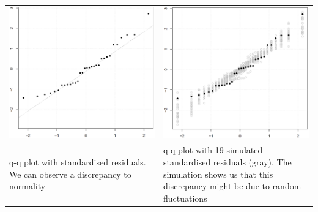 \begin{table}[H]
  \setlength{\tabcolsep}{0.2em}
  \scriptsize
  \begin{tabular}{p{}@{\hskip 1em}p{}}
    \includegraphics[width=\linewidth]{Pics/8.2.10.png}& \includegraphics[width=\linewidth]{Pics/8.2.11.png} \\
    q-q plot with standardised residuals. We can observe a discrepancy to normality &
    q-q plot with 19 simulated standardised residuals (gray). The simulation shows us that this discrepancy might be due to random fluctuations\\
  \end{tabular}
\end{table}
